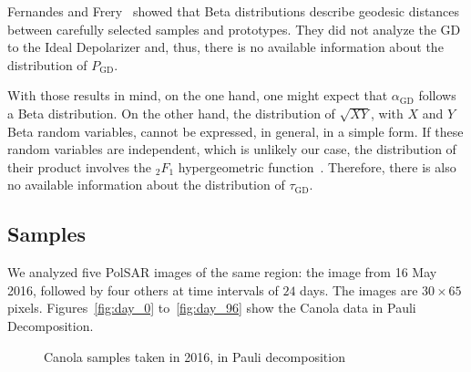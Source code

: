 \documentclass[journal]{IEEEtran}
\begin{document}
	Fernandes and Frery~\cite{StatisticalPropertiesofGeodesicDistancesBetweenSamplesandElementaryScatterersinPolSARImagery2019} showed that Beta distributions describe geodesic distances between carefully selected samples and prototypes.
	They did not analyze the GD to the Ideal Depolarizer and, thus, there is no available information about the distribution of $P_{\text{GD}}$.
	
	With those results in mind, on the one hand, one might expect that $\alpha_{\text{GD}}$ follows a Beta distribution.
	On the other hand, the distribution of $\sqrt{XY}$, with $X$ and $Y$ Beta random variables, cannot be expressed, in general, in a simple form.
	If these random variables are independent, which is unlikely our case, the distribution of their product involves the ${}_2F_{1}$ hypergeometric function~\cite[Corollary~2.1]{OntheDistributionoftheProductofIndependentBetaRandomVariables}.
	Therefore, there is also no available information about the distribution of $\tau_{\text{GD}}$.
	
	\subsection{Samples}
	
	We analyzed five PolSAR images of the same region: the image from 16 May 2016, followed by four others at time intervals of $24$ days. 
	The images are $30 \times 65$ pixels.
	Figures~\ref{fig:day_0} to~\ref{fig:day_96} show the Canola data in Pauli Decomposition. 
	
	\begin{figure}[hbt]
		\centering
		\caption{Canola samples taken in 2016, in Pauli decomposition}
		\label{fig:sample_images}
	\end{figure}
	
\end{document}
